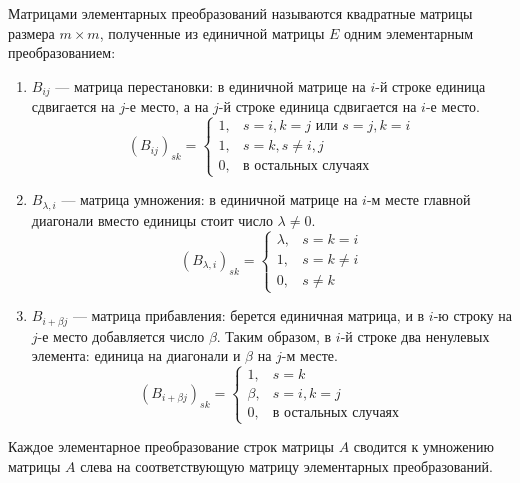 \begin{definition}
Матрицами элементарных преобразований называются квадратные матрицы размера $m \times m$, полученные из единичной матрицы $E$ одним элементарным преобразованием:
\begin{enumerate}
    \item $B_{ij}$ — матрица перестановки: в единичной матрице на $i$-й строке единица сдвигается на $j$-е место, а на $j$-й строке единица сдвигается на $i$-е место.
    \[
    (B_{ij})_{sk} = \begin{cases} 1, & s=i, k=j \text{ или } s=j, k=i \\ 1, & s=k, s \neq i, j \\ 0, & \text{в остальных случаях} \end{cases}
    \]
    \item $B_{\lambda, i}$ — матрица умножения: в единичной матрице на $i$-м месте главной диагонали вместо единицы стоит число $\lambda \neq 0$.
    \[
    (B_{\lambda, i})_{sk} = \begin{cases} \lambda, & s=k=i \\ 1, & s=k \neq i \\ 0, & s \neq k \end{cases}
    \]
    \item $B_{i+\beta j}$ — матрица прибавления: берется единичная матрица, и в $i$-ю строку на $j$-е место добавляется число $\beta$. Таким образом, в $i$-й строке два ненулевых элемента: единица на диагонали и $\beta$ на $j$-м месте.
    \[
    (B_{i+\beta j})_{sk} = \begin{cases} 1, & s=k \\ \beta, & s=i, k=j \\ 0, & \text{в остальных случаях} \end{cases}
    \]
\end{enumerate}
\end{definition}

\begin{theorem}
Каждое элементарное преобразование строк матрицы $A$ сводится к умножению матрицы $A$ слева на соответствующую матрицу элементарных преобразований.
\end{theorem}

